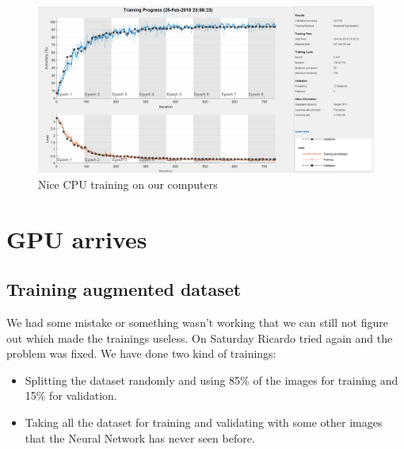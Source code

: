 \documentclass[]{article}
\begin{document}
	\begin{figure}[h]
		\centering
		\includegraphics[width=1\textwidth]{cpu_pablo_all.png}
		\caption{Nice CPU training on our computers}
	\end{figure}


\section{GPU arrives}

\subsection{Training augmented dataset}
We had some mistake or something wasn't working that we can still not figure out which made the trainings useless. On Saturday Ricardo tried again and the problem was fixed.
\newline
We have done two kind of trainings: 
\begin{itemize}
	\item Splitting the dataset randomly and using 85\% of the images for training and 15\% for validation.
	\item Taking all the dataset for training and validating with some other images that the Neural Network has never seen before.
\end{itemize}
\end{document}
